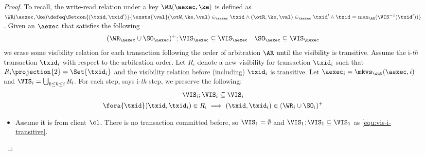 \begin{proof}
    To recall, the write-read relation under a key \( \WR(\aexec, \ke) \) is defined as 
    \( \WR(\aexec, \ke) \defeq \Setcon{ (\txid, \txid') }{ \exsts{\val} (\otW, \ke, \val) \in_\aexec \txid \land (\otR, \ke, \val) \in_\aexec \txid' \land \txid = \max_\AR(\VIS^{-1}(\txid')) }\).
    Given an \( \aexec \) that satisfies the following
    \[
        (\WR_\aexec \cup \SO_\aexec )^{+} ; \VIS_\aexec \subseteq \VIS_\aexec \quad \SO_\aexec \subseteq \VIS_\aexec
    \]
    we erase some visibility relation for each transaction following the order of arbitration \( \AR \) until the visibility is transitive.
    Assume the i-\emph{th} transaction \( \txid_i \)  with respect to the arbitration order.
    Let \( R_i \) denote a new visibility for transaction \( \txid_i \) such that
    \( R_i\projection{2} = \Set{\txid_i}\)
    and the visibility relation before (including) \( \txid_i \) is transitive.
    Let \( \aexec_i = \mkvs_\cut(\aexec, i) \) and \( \VIS_i = \bigcup_{ 0 \leq k \leq i} R_i \).
    For each step, says i-\emph{th} step, we  preserve the following:
    \begin{gather}
        \VIS_i ; \VIS_i \subseteq \VIS_i \label{equ:vis-i-transitive} \\
        \fora{\txid} (\txid,\txid_i) \in R_i \implies (\txid, \txid_i) \in (\WR_i \cup \SO_i)^{+}
        \label{equ:last-read-correct}
    \end{gather}
    
    \begin{itemize}
    \item {}
    Assume it is from client \( \cl \).
    There is no transaction committed before, so \( \VIS_1 = \emptyset \) and \( \VIS_1 ; \VIS_1 \subseteq \VIS_1 \) as \cref{equ:vis-i-transitive}.


\end{itemize}
\end{proof}

